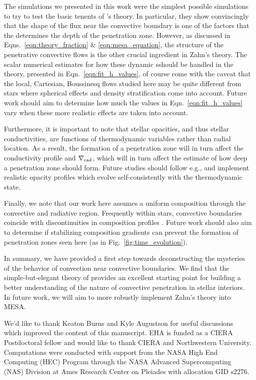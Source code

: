 \documentclass{aastex631}
\newcommand{\gradrad}{\ensuremath{\nabla_{\rm{rad}}}}
\begin{document}
The simulations we presented in this work were the simplest possible simulations to try to test the basic tenents of \citet{zahn1991}'s theory.
In particular, they show convincingly that the shape of the flux near the convective boundary is one of the factors that the determines the depth of the penetration zone.
However, as discussed in Eqns.~\ref{eqn:theory_fraction} \& \ref{eqn:mesa_equation}, the structure of the penetrative convective flows is the other crucial ingredient in Zahn's theory.
The scalar numerical estimates for how these dynamic sshould be handled in the theory, presented in Eqn.~\ref{eqn:fit_h_values}, of course come with the caveat that the local, Cartesian, Boussinesq flows studied here may be quite different from stars where spherical effects and density stratification come into account.
Future work should aim to determine how much the values in Eqn.~\ref{eqn:fit_h_values} vary when these more realistic effects are taken into account.

Furthermore, it is important to note that stellar opacities, and thus stellar conductivities, are functions of thermodynamic variables rather than radial location.
As a result, the formation of a penetration zone will in turn affect the conductivity profile and $\gradrad$, which will in turn affect the estimate of how deep a penetration zone should form.
Future studies should follow e.g., \citet{kapyla_etal_2017} and implement realistic opacity profiles which evolve self-consistently with the thermodynamic state.

Finally, we note that our work here assumes a uniform composition through the convective and radiative region.
Frequently within stars, convective boundaries coincide with discontinuities in composition profiles \citep{salaris_cassisi_2017}.
Future work should also aim to determine if stabilizing composition gradients can prevent the formation of penetration zones seen here (as in Fig.~\ref{fig:time_evolution}).

In summary, we have provided a first step towards deconstructing the mysteries of the behavior of convection near convective boundaries.
We find that the simple-but-elegant theory of \citet{zahn1991} provides an excellent starting point for building a better understanding of the nature of convective penetration in stellar interiors.
In future work, we will aim to more robustly implement Zahn's theory into MESA.





\begin{acknowledgments}
We'd like to thank Keaton Burns and Kyle Augustson for useful discussions which improved the content of this manuscript.
EHA is funded as a CIERA Postdoctoral fellow and would like to thank CIERA and Northwestern University. 
Computations were conducted with support from the NASA High End Computing (HEC) Program through the NASA Advanced Supercomputing (NAS) Division at Ames Research Center on Pleiades with allocation GID s2276.
\end{acknowledgments}
\end{document}
